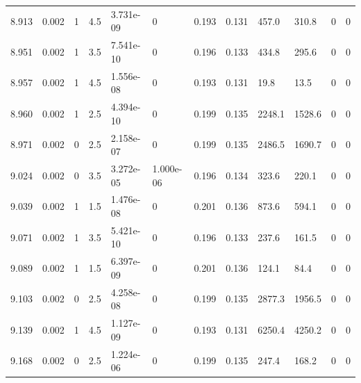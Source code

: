 \documentclass[preview]{standalone}
\begin{document}
{{{{{{{{{\begin{tabular}{L{1.2cm}C{1.2cm} C{0.3cm}C{0.5cm} C{1.4cm}C{1.4cm} C{1.4cm}C{1.4cm} C{1.6cm}C{1.6cm} C{1.6cm}C{1.6cm}}
  8.913  &  0.002  & 1     & 4.5 &  3.731e-09  & 0  &  0.193&   0.131& 457.0 & 310.8   &  0 & 0  \\ 
  8.951  &  0.002  & 1     & 3.5 &  7.541e-10  & 0  &  0.196&   0.133& 434.8 & 295.6   &  0 & 0  \\ 
  8.957  &  0.002  & 1     & 4.5 &  1.556e-08  & 0  &  0.193&   0.131& 19.8 & 13.5   &  0 & 0  \\ 
  8.960  &  0.002  & 1     & 2.5 &  4.394e-10  & 0  &  0.199&   0.135& 2248.1 & 1528.6   &  0 & 0  \\ 
  8.971  &  0.002  & 0     & 2.5 &  2.158e-07  & 0  &  0.199&   0.135& 2486.5 & 1690.7   &  0 & 0  \\ 
  9.024  &  0.002  & 0     & 3.5 &  3.272e-05  & 1.000e-06  &  0.196&   0.134& 323.6 & 220.1   &  0 & 0  \\ 
  9.039  &  0.002  & 1     & 1.5 &  1.476e-08  & 0  &  0.201&   0.136& 873.6 & 594.1   &  0 & 0  \\ 
  9.071  &  0.002  & 1     & 3.5 &  5.421e-10  & 0  &  0.196&   0.133& 237.6 & 161.5   &  0 & 0  \\ 
  9.089  &  0.002  & 1     & 1.5 &  6.397e-09  & 0  &  0.201&   0.136& 124.1 & 84.4   &  0 & 0  \\ 
  9.103  &  0.002  & 0     & 2.5 &  4.258e-08  & 0  &  0.199&   0.135& 2877.3 & 1956.5   &  0 & 0  \\ 
  9.139  &  0.002  & 1     & 4.5 &  1.127e-09  & 0  &  0.193&   0.131& 6250.4 & 4250.2   &  0 & 0  \\ 
  9.168  &  0.002  & 0     & 2.5 &  1.224e-06  & 0  &  0.199&   0.135& 247.4 & 168.2   &  0 & 0  \\ 
\hline 
\end{tabular} 

}}}}}}}}}
\end{document}
